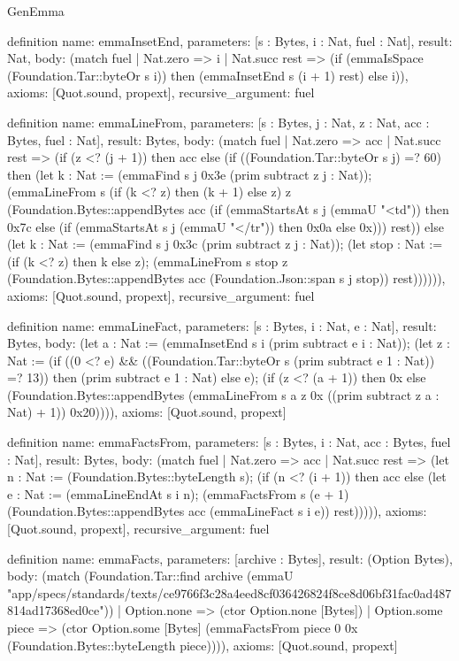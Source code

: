 \begin{lexlean}{GenEmma}
\begin{semanticmodule}
definition{
  name: emmaInsetEnd,
  parameters: [s : Bytes, i : Nat, fuel : Nat],
  result: Nat,
  body: (match fuel
    | Nat.zero => i
    | Nat.succ rest => (if (emmaIsSpace (Foundation.Tar::byteOr s i)) then (emmaInsetEnd s (i + 1) rest) else i)),
  axioms: [Quot.sound, propext],
  recursive_argument: fuel
}

definition{
  name: emmaLineFrom,
  parameters: [s : Bytes, j : Nat, z : Nat, acc : Bytes, fuel : Nat],
  result: Bytes,
  body: (match fuel
    | Nat.zero => acc
    | Nat.succ rest => (if (z <? (j + 1)) then acc else (if ((Foundation.Tar::byteOr s j) =? 60) then (let k : Nat := (emmaFind s j 0x3e (prim subtract z j : Nat)); (emmaLineFrom s (if (k <? z) then (k + 1) else z) z (Foundation.Bytes::appendBytes acc (if (emmaStartsAt s j (emmaU "<td")) then 0x7c else (if (emmaStartsAt s j (emmaU "</tr")) then 0x0a else 0x))) rest)) else (let k : Nat := (emmaFind s j 0x3c (prim subtract z j : Nat)); (let stop : Nat := (if (k <? z) then k else z); (emmaLineFrom s stop z (Foundation.Bytes::appendBytes acc (Foundation.Json::span s j stop)) rest)))))),
  axioms: [Quot.sound, propext],
  recursive_argument: fuel
}

definition{
  name: emmaLineFact,
  parameters: [s : Bytes, i : Nat, e : Nat],
  result: Bytes,
  body: (let a : Nat := (emmaInsetEnd s i (prim subtract e i : Nat)); (let z : Nat := (if ((0 <? e) && ((Foundation.Tar::byteOr s (prim subtract e 1 : Nat)) =? 13)) then (prim subtract e 1 : Nat) else e); (if (z <? (a + 1)) then 0x else (Foundation.Bytes::appendBytes (emmaLineFrom s a z 0x ((prim subtract z a : Nat) + 1)) 0x20)))),
  axioms: [Quot.sound, propext]
}

definition{
  name: emmaFactsFrom,
  parameters: [s : Bytes, i : Nat, acc : Bytes, fuel : Nat],
  result: Bytes,
  body: (match fuel
    | Nat.zero => acc
    | Nat.succ rest => (let n : Nat := (Foundation.Bytes::byteLength s); (if (n <? (i + 1)) then acc else (let e : Nat := (emmaLineEndAt s i n); (emmaFactsFrom s (e + 1) (Foundation.Bytes::appendBytes acc (emmaLineFact s i e)) rest))))),
  axioms: [Quot.sound, propext],
  recursive_argument: fuel
}

definition{
  name: emmaFacts,
  parameters: [archive : Bytes],
  result: (Option Bytes),
  body: (match (Foundation.Tar::find archive (emmaU "app/specs/standards/texts/ce9766f3c28a4eed8cf036426824f8ce8d06bf31fac0ad487814ad17368ed0ce"))
    | Option.none => (ctor Option.none [Bytes])
    | Option.some piece => (ctor Option.some [Bytes] (emmaFactsFrom piece 0 0x (Foundation.Bytes::byteLength piece)))),
  axioms: [Quot.sound, propext]
}


\end{semanticmodule}
\end{lexlean}
